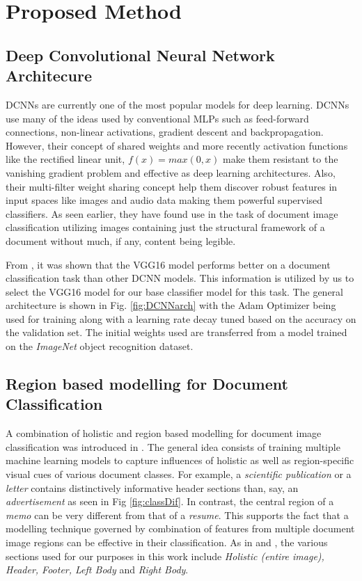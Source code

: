 \documentclass[10pt,conference,a4paper]{IEEEtran}
\begin{document}
\section{Proposed Method}

\subsection{Deep Convolutional Neural Network Architecure}
DCNNs are currently one of the most popular models for deep learning. DCNNs use many of the ideas used by conventional MLPs such as feed-forward connections, non-linear activations, gradient descent and backpropagation. However, their concept of shared weights and more recently activation functions like the rectified linear unit, $f(x)=max(0,x)$ make them resistant to the vanishing gradient problem and effective as deep learning architectures. Also, their multi-filter weight sharing concept help them discover robust features in input spaces like images and audio data making them powerful supervised classifiers.\cite{Krizhevsky2012,sainath2013deep} As seen earlier, they have found use in the task of document image classification utilizing images containing just the structural framework of a document without much, if any, content being legible.

From \cite{tensmeyer2017analysis, csurka2016right, afzal2017cutting}, it was shown that the VGG16 model \cite{simonyan2014very} performs better on a document classification task than other DCNN models. This information is utilized by us to select the VGG16 model for our base classifier model for this task. The general architecture is shown in Fig. \ref{fig:DCNNarch} with the Adam Optimizer \cite{kingma2014adam} being used for training along with a learning rate decay tuned based on the accuracy on the validation set. The initial weights used are transferred from a model trained on the \textit{ImageNet} object recognition dataset.

\subsection{Region based modelling for Document Classification}
A combination of holistic and region based modelling for document image classification was introduced in \cite{harley2015evaluation}. The general idea consists of training multiple machine learning models to capture influences of holistic as well as region-specific visual cues of various document classes. For example, a \textit{scientific publication} or a \textit{letter} contains distinctively informative header sections than, say, an \textit{advertisement} as seen in Fig \ref{fig:classDif}. In contrast, the central region of a \textit{memo} can be very different from that of a \textit{resume}. This supports the fact that a modelling technique governed by combination of features from multiple document image regions can be effective in their classification. As in \cite{harley2015evaluation} and \cite{roy2016generalized}, the various sections used for our purposes in this work include \textit{Holistic (entire image), Header, Footer, Left Body} and \textit{Right Body}.
\end{document}
